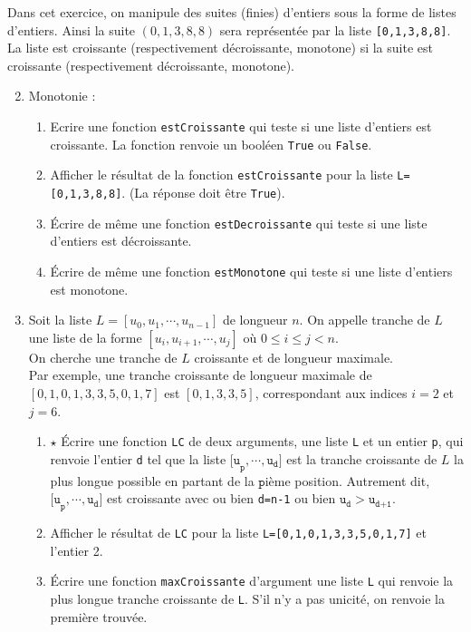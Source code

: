 Dans cet exercice, on manipule des suites (finies) d'entiers sous la forme de listes d'entiers. Ainsi la suite $(0,1,3,8,8)$ sera représentée par la liste \texttt{[0,1,3,8,8]}.\\
La liste est croissante (respectivement décroissante, monotone) si la suite est croissante (respectivement décroissante, monotone). 
\begin{enumerate}
\setcounter{enumi}{1}
\item Monotonie :
\begin{enumerate}
\item Ecrire une fonction \texttt{estCroissante} qui teste si une liste d'entiers est croissante. La fonction renvoie un booléen \verb?True? ou \verb?False?. %
\item Afficher le résultat de la fonction \verb?estCroissante? pour la liste \verb?L=[0,1,3,8,8]?. (La réponse doit être \verb?True?).
\item \'Ecrire de même une fonction \texttt{estDecroissante} qui teste si une liste d'entiers est décroissante.
\item \'Ecrire de même une fonction \texttt{estMonotone} qui teste si une liste d'entiers est monotone.
\end{enumerate}
\item Soit la liste $L=[u_0,u_1,\cdots,u_{n-1}]$ de longueur $n$. On appelle tranche de $L$ une liste de la forme $[u_i,u_{i+1},\cdots,u_j]$ où $0\leq i \leq j <n$.\\
On cherche une tranche de $L$ croissante et de longueur maximale.\\
Par exemple, une tranche croissante de longueur maximale de $[0,1,0,1,3,3,5,0,1,7]$ est $[0,1,3,3,5]$, correspondant aux indices $i=2$ et $j=6$.
\begin{enumerate}
\item $\star$ \'Ecrire une fonction \texttt{LC} de deux arguments, une liste \texttt{L} et un entier \texttt{p}, qui renvoie l'entier \texttt{d} tel que la liste $\texttt{[u}_\texttt{p},\cdots,\texttt{u}_\texttt{d}\texttt{]}$ est la tranche croissante de $L$ la plus longue possible en partant de la $\texttt{p}$ième position. Autrement dit,  $\texttt{[u}_\texttt{p},\cdots,\texttt{u}_\texttt{d}\texttt{]}$ est croissante avec ou bien \texttt{d=n-1} ou bien $\texttt{u}_{\texttt{d}}>\texttt{u}_{\texttt{d+1}}$. 
\item Afficher le résultat de \texttt{LC} pour la liste \verb?L=[0,1,0,1,3,3,5,0,1,7]? et l'entier 2.
\item \'Ecrire une fonction \texttt{maxCroissante} d'argument une liste \texttt{L} qui renvoie la plus longue tranche croissante de \texttt{L}. S'il n'y a pas unicité, on renvoie la première trouvée.

\end{enumerate}
\end{enumerate}

